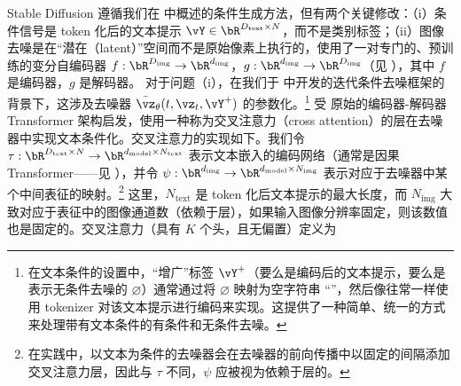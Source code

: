 \documentclass[../../book-main_zh.tex]{subfiles}
\begin{document}
Stable Diffusion 遵循我们在  中概述的条件生成方法，但有两个关键修改：（i）条件信号是 token 化后的文本提示 $\vY \in
\bR^{D_{\mathrm{text}} \times N}$，而不是类别标签；（ii）图像去噪是在“潜在（latent）”空间而不是原始像素上执行的，使用了一对专门的、预训练的变分自编码器 $f : \bR^{D_{\mathrm{img}}} \to
\bR^{d_{\mathrm{img}}}$，$g : \bR^{d_{\mathrm{img}}} \to
\bR^{D_{\mathrm{img}}}$（见 ），其中 $f$ 是编码器，$g$ 是解码器。
对于问题（i），在我们于  中开发的迭代条件去噪框架的背景下，这涉及去噪器 $\bar{\vz}_{\theta}(t, \vz_t, \vY^+)$ 的参数化。\footnote{在文本条件的设置中，“增广”标签 $\vY^+$（要么是编码后的文本提示，要么是表示无条件去噪的 $\varnothing$）通常通过将 $\varnothing$ 映射为空字符串 ``''，然后像往常一样使用 tokenizer 对该文本提示进行编码来实现。这提供了一种简单、统一的方式来处理带有文本条件的有条件和无条件去噪。}
\textcite{rombach2022high} 受 \textcite{vaswani2017attention} 原始的编码器-解码器 Transformer 架构启发，使用一种称为交叉注意力（cross attention）的层在去噪器中实现文本条件化。交叉注意力的实现如下。我们令 $\tau : \bR^{D_{\mathrm{text}} \times N} \to
\bR^{d_{\mathrm{model}} \times N_{\mathrm{text}}}$
表示文本嵌入的编码网络（通常是因果 Transformer——见 ），并令 $\psi : \bR^{d_{\mathrm{img}}}
\to \bR^{d_{\mathrm{model}} \times N_{\mathrm{img}}}$ 表示对应于去噪器中某个中间表征的映射。\footnote{在实践中，以文本为条件的去噪器会在去噪器的前向传播中以固定的间隔添加交叉注意力层，因此与 $\tau$ 不同，$\psi$ 应被视为依赖于层的。} %
这里，$N_{\mathrm{text}}$ 是 token 化后文本提示的最大长度，而 $N_{\mathrm{img}}$ 大致对应于表征中的图像通道数（依赖于层），如果输入图像分辨率固定，则该数值也是固定的。交叉注意力（具有 $K$ 个头，且无偏置）定义为
\end{document}
